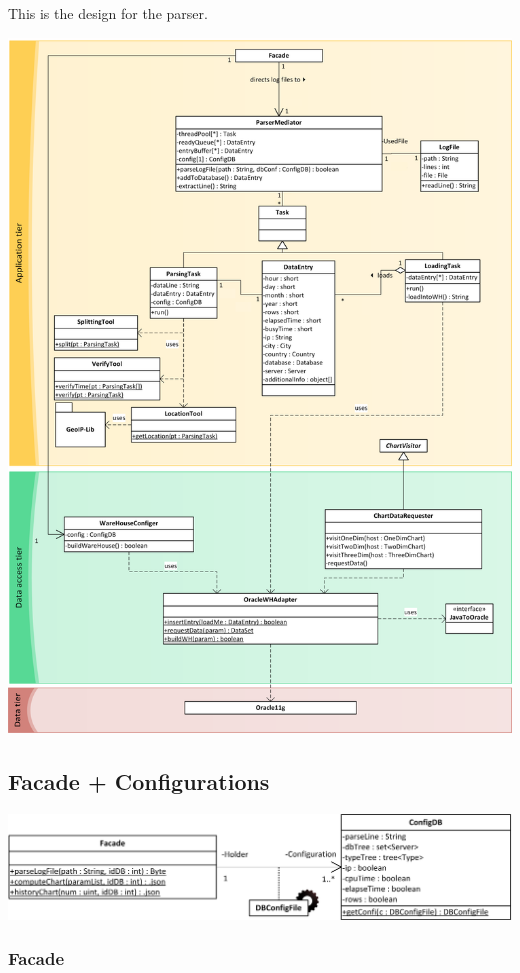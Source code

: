 This is the design for the parser. 

\begin{center}
\includegraphics[width=0.9\linewidth]{Pictures/AppTierDia2.png}
\end{center}  

\subsection{Facade + Configurations}

\begin{center}
\includegraphics{Pictures/Parts/FacadeConfi.png}
\end{center}   

\subsubsection*{Facade}
